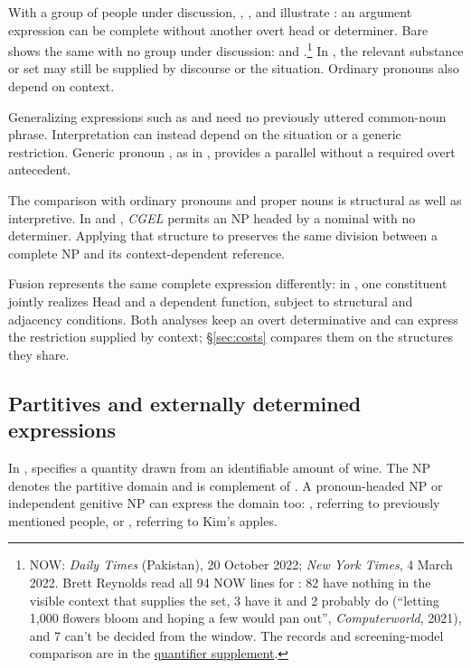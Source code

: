 \documentclass[12pt]{article}
\begin{document}
With a group of people under discussion, , , and  illustrate : an argument expression can be complete without another overt head or determiner. Bare  shows the same with no group under discussion:  and .\footnote{NOW: \textit{Daily Times} (Pakistan), 20 October 2022; \textit{New York Times}, 4 March 2022. Brett Reynolds read all 94 NOW lines for : 82 have nothing in the visible context that supplies the set, 3 have it and 2 probably do (\enquote{letting 1,000 flowers bloom and hoping a few would pan out}, \textit{Computerworld}, 2021), and 7 can't be decided from the window. The records and screening-model comparison are in the \href{run:quantifier-controls.pdf}{quantifier supplement}.} In , the relevant substance or set may still be supplied by discourse or the situation. Ordinary pronouns also depend on context.

Generalizing expressions such as  and  need no previously uttered common-noun phrase. Interpretation can instead depend on the situation or a generic restriction. Generic pronoun , as in , provides a parallel without a required overt antecedent.

The comparison with ordinary pronouns and proper nouns is structural as well as interpretive. In  and , \textit{CGEL} permits an NP headed by a nominal with no determiner. Applying that structure to  preserves the same division between a complete NP and its context-dependent reference.

Fusion represents the same complete expression differently: in \textcite{Payne2007}, one constituent jointly realizes Head and a dependent function, subject to structural and adjacency conditions. Both analyses keep an overt determinative and can express the restriction supplied by context; §\ref{sec:costs} compares them on the structures they share.

\subsection{Partitives and externally determined expressions}\label{sec:modification}

In ,  specifies a quantity drawn from an identifiable amount of wine. The NP  denotes the partitive domain and is complement of . A pronoun-headed NP or independent genitive NP can express the domain too: , referring to previously mentioned people, or , referring to Kim's apples.
\end{document}
